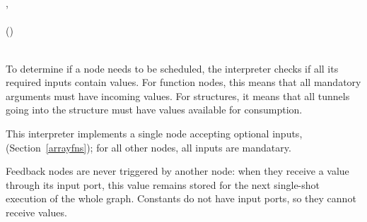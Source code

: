 \begin{hscode}
\>[10]{}\<[E]%
\\
\>[10]{}\<[13]%
\>[13]{}\<[20]%
\>[20]{}\mathrel{=}\;\<[E]%
\\
\>[10]{}\<[13]%
\>[13]{}\<[20]%
\>[20]{}\mathrel{=}\llparenthesis {}, \rrparenthesis {}\<[E]%
\\
\>[7]{}\<[10]%
\>[10]{}\<[E]%
\\
\>[10]{}\<[13]%
\>[13]{}\;\;(\mathbin{\$}\;\mathbin{!!})\;\mathrel{\wedge}\notin {}\<[E]%
\\
\>[10]{}\<[13]%
\>[13]{}\;\<[E]%
\\
\>[10]{}\<[13]%
\>[13]{}\;\<[E]%
\ColumnHook
\end{hscode}\resethooks

To determine if a node needs to be scheduled, the interpreter checks if all
its required inputs contain values. For function nodes, this means that
all mandatory arguments must have incoming values. For structures, it means
that all tunnels going into the structure must have values available for
consumption.

This interpreter implements a single node accepting optional inputs,
 (Section~\ref{arrayfns}); for all other nodes, all
inputs are mandatary.

Feedback nodes are never triggered by another node: when they receive
a value through its input port, this value remains stored for the next
single-shot execution of the whole graph. Constants do not have input ports,
so they cannot receive values.

